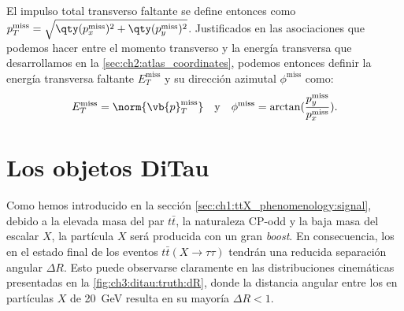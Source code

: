 El impulso total transverso faltante se define entonces como $p_T^{\text{miss}} = \sqrt{\qty(p_x^{\text{miss}})^2 + \qty(p_y^{\text{miss}})^2}$. Justificados en las asociaciones que podemos hacer entre el momento transverso y la energía transversa que desarrollamos en la \cref{sec:ch2:atlas_coordinates}, podemos entonces definir la energía transversa faltante $E_T^{\text{miss}}$ y su dirección azimutal $\phi^{\text{miss}}$ como:
\[ E_T^{\text{miss}} = \norm{\vb{p}_T^{\text{miss}}} \quad \text{y} \quad \phi^{\text{miss}} = \arctan(\frac{p_y^{\text{miss}}}{p_x^{\text{miss}}}). \]






\section{Los objetos DiTau} \label{sec:ch3:ditaus}

Como hemos introducido en la sección \cref{sec:ch1:ttX_phenomenology:signal}, debido a la elevada masa del par $t\bar{t}$, la naturaleza CP-odd y la baja masa del escalar $X$, la partícula $X$ será producida con un gran \textit{boost}. En consecuencia, los \ttaus en el estado final de los eventos $t\bar{t}(X\to\tau\tau)$ tendrán una reducida separación angular $\Delta R$. Esto puede observarse claramente en las distribuciones cinemáticas presentadas en la \cref{fig:ch3:ditau:truth:dR}, donde la distancia angular entre los \thad en partículas $X$ de \SI{20}{\GeV} resulta en su mayoría $\Delta R < 1$. 

